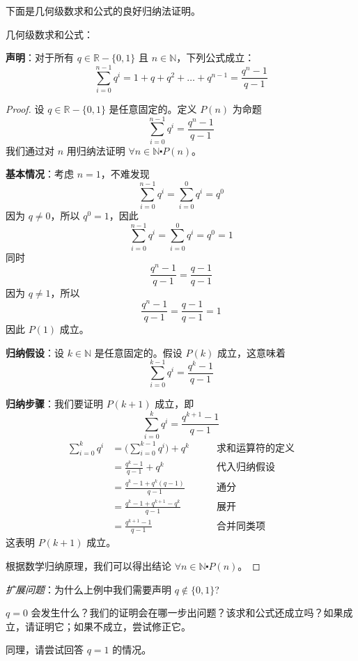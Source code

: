 下面是几何级数求和公式的良好归纳法证明。\\

\begin{example}
    几何级数求和公式：

    \textbf{声明}：对于所有 $q \in \mathbb{R}-\{0,1\}$ 且 $n \in \mathbb{N}$，下列公式成立：
    \[\sum_{i=0}^{n-1}q^i = 1+q+q^2+\dots+q^{n-1} = \frac{q^n-1}{q-1}\]
\end{example}

\begin{proof}
    设 $q \in \mathbb{R}-\{0,1\}$ 是任意固定的。定义 $P(n)$ 为命题
    \[\sum_{i=0}^{n-1}q^i = \frac{q^n-1}{q-1}\]
    我们通过对 $n$ 用归纳法证明 $\forall n \in \mathbb{N} \centerdot P(n)$。

    \textbf{基本情况}：考虑 $n=1$，不难发现
    \[\sum_{i=0}^{n-1}q^i = \sum_{i=0}^{0}q^i = q^0\]
    因为 $q \neq 0$，所以 $q^0=1$，因此
    \[\sum_{i=0}^{n-1}q^i = \sum_{i=0}^{0}q^i = q^0 = 1\]
    同时
    \[\frac{q^n-1}{q-1} = \frac{q-1}{q-1}\]
    因为 $q \neq 1$，所以
    \[\frac{q^n-1}{q-1} = \frac{q-1}{q-1} = 1\]
    因此 $P(1)$ 成立。

    \textbf{归纳假设}：设 $k \in \mathbb{N}$ 是任意固定的。假设 $P(k)$ 成立，这意味着
    \[\sum_{i=0}^{k-1}q^i = \frac{q^k-1}{q-1}\]

    \textbf{归纳步骤}：我们要证明 $P(k+1)$ 成立，即
    \[\sum_{i=0}^{k}q^i = \frac{q^{k+1}-1}{q-1}\]
    \begin{align*}
        \sum_{i=0}^{k}q^i &= \Bigg(\sum_{i=0}^{k-1}q^i\Bigg)+q^k &\qquad \text{求和运算符的定义}\\
        &= \frac{q^k-1}{q-1} + q^k &\qquad \text{代入归纳假设}\\
        &= \frac{q^k-1+q^k(q-1)}{q-1} &\qquad \text{通分}\\
        &= \frac{q^k-1+q^{k+1}-q^k}{q-1} &\qquad \text{展开}\\ 
        &= \frac{q^{k+1}-1}{q-1} &\qquad \text{合并同类项}
    \end{align*}
    这表明 $P(k+1)$ 成立。

    根据数学归纳原理，我们可以得出结论 $\forall n \in \mathbb{N} \centerdot P(n)$。
\end{proof}

\emph{扩展问题}：为什么上例中我们需要声明 $q \notin \{0, 1\}$?

$q=0$ 会发生什么？我们的证明会在哪一步出问题？该求和公式还成立吗？如果成立，请证明它；如果不成立，尝试修正它。

同理，请尝试回答 $q=1$ 的情况。

